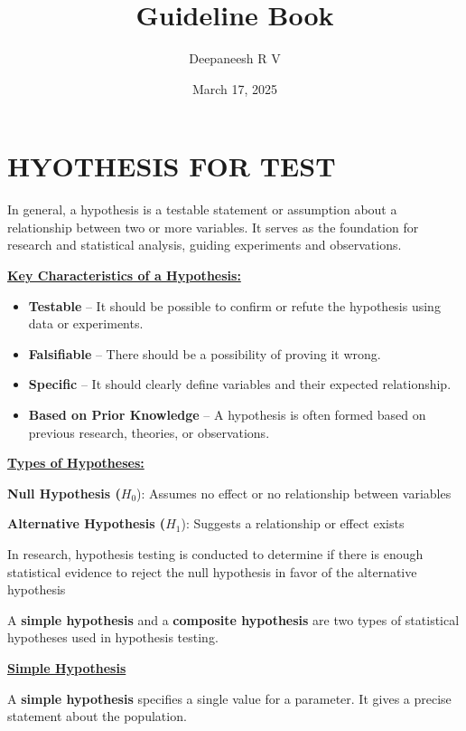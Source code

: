 \documentclass[
]{article}
\title{Guideline Book}
\author{Deepaneesh R V}
\date{March 17, 2025}
\begin{document}
\maketitle

{
\setcounter{tocdepth}{4}
\tableofcontents
}
\newpage

\section{HYOTHESIS FOR TEST}\label{hyothesis-for-test}

In general, a hypothesis is a testable statement or assumption about a
relationship between two or more variables. It serves as the foundation
for research and statistical analysis, guiding experiments and
observations.

\ul{\textbf{Key Characteristics of a Hypothesis:}}

\begin{itemize}
\item
  \textbf{Testable} -- It should be possible to confirm or refute the
  hypothesis using data or experiments.
\item
  \textbf{Falsifiable} -- There should be a possibility of proving it
  wrong.
\item
  \textbf{Specific} -- It should clearly define variables and their
  expected relationship.
\item
  \textbf{Based on Prior Knowledge} -- A hypothesis is often formed
  based on previous research, theories, or observations.
\end{itemize}

\ul{\textbf{Types of Hypotheses:}}

\textbf{Null Hypothesis (}\(H_0\)): Assumes no effect or no relationship
between variables

\textbf{Alternative Hypothesis (}\(H_1\)): Suggests a relationship or
effect exists

In research, hypothesis testing is conducted to determine if there is
enough statistical evidence to reject the null hypothesis in favor of
the alternative hypothesis

A \textbf{simple hypothesis} and a \textbf{composite hypothesis} are two
types of statistical hypotheses used in hypothesis testing.

\ul{\textbf{Simple Hypothesis}}

A \textbf{simple hypothesis} specifies a single value for a parameter.
It gives a precise statement about the population.
\end{document}
